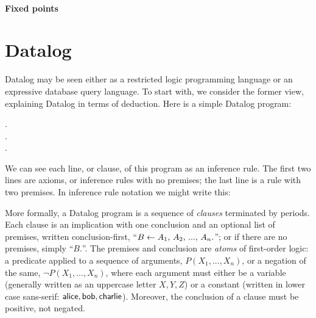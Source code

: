 \paragraph{Fixed points}


\section{Datalog}
\label{section-datalog}

Datalog may be seen either as a restricted logic programming language or an
expressive database query language. To start with, we consider the former view,
explaining Datalog in terms of deduction. Here is a simple Datalog program:

\begin{datalog}
  .
  \\
  .
  \\
   \gets {} \conj {}.
\end{datalog}

\noindent
We can see each line, or clause, of this program as an inference rule. The first
two lines are axioms, or inference rules with no premises; the last line is a
rule with two premises. In inference rule notation we might write this:
%
\begin{mathpar}


\end{mathpar}

\noindent
More formally, a Datalog program is a sequence of \emph{clauses} terminated by
periods. Each clause is an implication with one conclusion and an optional list
of premises, written conclusion-first, ``$B \gets A_1 \conj A_2 \conj ... \conj
A_n.$''; or if there are no premises, simply ``$B.$''. The premises and
conclusion are \emph{atoms} of first-order logic: a predicate applied to a
sequence of arguments, $P(X_1, ..., X_n)$, or a negation of the same, $\neg
P(X_1, ..., X_n)$, where each argument must either be a variable (generally
written as an uppercase letter $X,Y,Z$) or a constant (written in lower case
sans-serif: $\datum{alice}, \datum{bob}, \datum{charlie}$). Moreover, the
conclusion of a clause must be positive, not negated.

